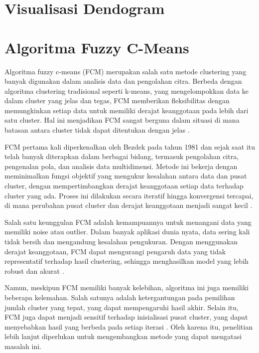 \documentclass[
  oneside]{book}
\begin{document}
\chapter{Visualisasi Dendogram}\label{vizhc}

\chapter{Algoritma Fuzzy C-Means}\label{fcm}

Algoritma fuzzy c-means (FCM) merupakan salah satu metode clustering yang banyak digunakan dalam analisis data dan pengolahan citra. Berbeda dengan algoritma clustering tradisional seperti k-means, yang mengelompokkan data ke dalam cluster yang jelas dan tegas, FCM memberikan fleksibilitas dengan memungkinkan setiap data untuk memiliki derajat keanggotaan pada lebih dari satu cluster. Hal ini menjadikan FCM sangat berguna dalam situasi di mana batasan antara cluster tidak dapat ditentukan dengan jelas \citep{bezdek1981pattern}.

FCM pertama kali diperkenalkan oleh Bezdek pada tahun 1981 dan sejak saat itu telah banyak diterapkan dalam berbagai bidang, termasuk pengolahan citra, pengenalan pola, dan analisis data multidimensi. Metode ini bekerja dengan meminimalkan fungsi objektif yang mengukur kesalahan antara data dan pusat cluster, dengan mempertimbangkan derajat keanggotaan setiap data terhadap cluster yang ada. Proses ini dilakukan secara iteratif hingga konvergensi tercapai, di mana perubahan pusat cluster dan derajat keanggotaan menjadi sangat kecil \citep{dunn1973fuzzy}.

Salah satu keunggulan FCM adalah kemampuannya untuk menangani data yang memiliki noise atau outlier. Dalam banyak aplikasi dunia nyata, data sering kali tidak bersih dan mengandung kesalahan pengukuran. Dengan menggunakan derajat keanggotaan, FCM dapat mengurangi pengaruh data yang tidak representatif terhadap hasil clustering, sehingga menghasilkan model yang lebih robust dan akurat \citep{pal1995cluster}.

Namun, meskipun FCM memiliki banyak kelebihan, algoritma ini juga memiliki beberapa kelemahan. Salah satunya adalah ketergantungan pada pemilihan jumlah cluster yang tepat, yang dapat mempengaruhi hasil akhir. Selain itu, FCM juga dapat menjadi sensitif terhadap inisialisasi pusat cluster, yang dapat menyebabkan hasil yang berbeda pada setiap iterasi \citep{huang1998extensions}. Oleh karena itu, penelitian lebih lanjut diperlukan untuk mengembangkan metode yang dapat mengatasi masalah ini.
\end{document}
